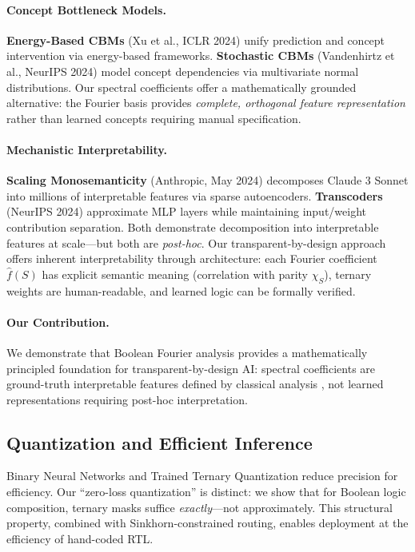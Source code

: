 \documentclass[Royal,times,sageh]{sagej}
\begin{document}
\paragraph{Concept Bottleneck Models.} \textbf{Energy-Based CBMs} (Xu et al., ICLR 2024) unify prediction and concept intervention via energy-based frameworks. \textbf{Stochastic CBMs} (Vandenhirtz et al., NeurIPS 2024) model concept dependencies via multivariate normal distributions. Our spectral coefficients offer a mathematically grounded alternative: the Fourier basis provides \textit{complete, orthogonal feature representation} rather than learned concepts requiring manual specification.

\paragraph{Mechanistic Interpretability.} \textbf{Scaling Monosemanticity} (Anthropic, May 2024) decomposes Claude 3 Sonnet into millions of interpretable features via sparse autoencoders. \textbf{Transcoders} (NeurIPS 2024) approximate MLP layers while maintaining input/weight contribution separation. Both demonstrate decomposition into interpretable features at scale---but both are \textit{post-hoc}. Our transparent-by-design approach offers inherent interpretability through architecture: each Fourier coefficient $\hat{f}(S)$ has explicit semantic meaning (correlation with parity $\chi_S$), ternary weights are human-readable, and learned logic can be formally verified.

\paragraph{Our Contribution.} We demonstrate that Boolean Fourier analysis provides a mathematically principled foundation for transparent-by-design AI: spectral coefficients are ground-truth interpretable features defined by classical analysis \cite{odonnell2014analysis}, not learned representations requiring post-hoc interpretation.

\subsection{Quantization and Efficient Inference}

Binary Neural Networks \cite{courbariaux2016binarized} and Trained Ternary Quantization \cite{zhu2017trained} reduce precision for efficiency. Our ``zero-loss quantization'' is distinct: we show that for Boolean logic composition, ternary masks suffice \textit{exactly}---not approximately. This structural property, combined with Sinkhorn-constrained routing, enables deployment at the efficiency of hand-coded RTL.
\end{document}

